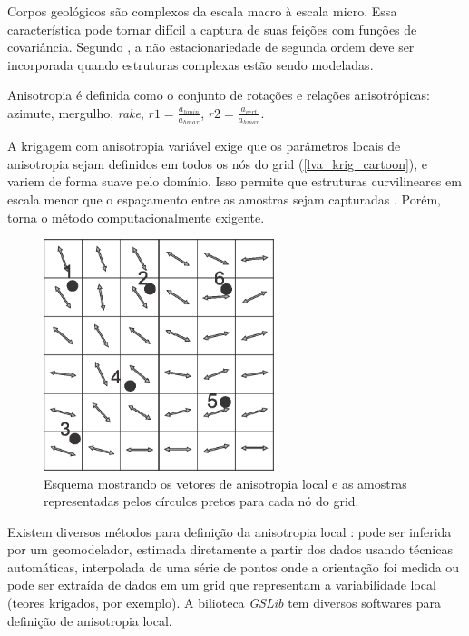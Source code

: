 Corpos geológicos são complexos da escala macro à escala micro. Essa característica pode tornar difícil a captura de suas feições com funções de covariância. Segundo , a não estacionariedade de segunda ordem deve ser incorporada quando estruturas complexas estão sendo modeladas.

Anisotropia é definida como o conjunto de rotações e relações anisotrópicas: azimute, mergulho, \textit{rake}, $r1 = \frac{a_{hmin}}{a_{hmax}}$, $r2 = \frac{a_{vert}}{a_{hmax}}$. 


A krigagem com anisotropia variável exige que os parâmetros locais de anisotropia sejam definidos em todos os nós do grid (\autoref{lva_krig_cartoon}), e variem de forma suave pelo domínio. Isso permite que estruturas curvilineares em escala menor que o espaçamento entre as amostras sejam capturadas \cite{martin2017implicitmodeling}. Porém, torna o método computacionalmente exigente.

\begin{figure}[H]
\caption{\label{lva_krig_cartoon}Esquema mostrando os vetores de anisotropia local e as amostras representadas pelos círculos pretos para cada nó do grid.}
	\centering
		\includegraphics[width=0.6\textwidth]{capitulo_2/imagens/lvakrig.jpg}
\end{figure}

Existem diversos métodos para definição da anisotropia local \cite{lillah2015inference}: pode ser inferida por um geomodelador, estimada diretamente a partir dos dados usando técnicas automáticas, interpolada de uma série de pontos onde a orientação foi medida ou pode ser extraída de dados em um grid que representam a variabilidade local (teores krigados, por exemplo). A bilioteca \textit{GSLib} tem diversos softwares para definição de anisotropia local. 

